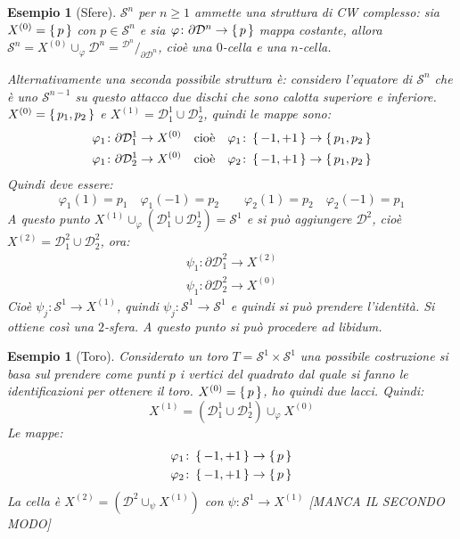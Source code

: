 \documentclass[10pt, twoside=false, x11names]{scrbook}
\newtheorem{example}[theorem]{Esempio}
\newcommand{\Sph}[1][]{\mathcal{S}^#1}
\newcommand{\Disk}[1][]{\mathcal{D}^#1}
\newcommand*\quot[2]{{^{\textstyle #1}\big/_{\textstyle #2}}}
\let\phi\varphi
\begin{document}
\begin{example}[Sfere]
  $ \Sph{n} $ per $ n \geq 1 $ ammette una struttura di CW complesso: sia $ X^{(0)} = \set{p} $ con
  $ p \in \Sph{n} $ e sia $ \phi \colon \partial \Disk{n} \to \set{p} $ mappa costante, allora
  $ \Sph{n} = X^{(0)} \cup_\phi \Disk{n} = \quot{\Disk{n}}{\partial \Disk{n}} $, cioè una $ 0 $-cella e una
  $ n $-cella.

  Alternativamente una seconda possibile struttura è: considero l'equatore di $ \Sph{n} $ che
  è uno $ \Sph{n-1} $ su questo attacco due dischi che sono calotta superiore e inferiore.
  $ X^{(0)} = \set{p_1, p_2} $ e $ X^{(1)} = \Disk{1}_1 \cup \Disk{1}_2 $, quindi le mappe
  sono:
  \begin{gather*}
    \phi_1 \colon \partial \Disk{1}_1 \to X^{(0)} \quad \text{cioè} \quad \phi_1 \colon \set{-1, +1} \to \set{p_1, p_2} \\
    \phi_1 \colon \partial \Disk{1}_2 \to X^{(0)} \quad \text{cioè} \quad \phi_2 \colon \set{-1, +1} \to \set{p_1, p_2}
  \end{gather*}
  Quindi deve essere:
  \[
    \phi_1(1) = p_1 \quad \phi_1(-1) = p_2 \qquad  \phi_2(1) = p_2 \quad \phi_2(-1) = p_1
  \]
  A questo punto $ X^{(1)} \cup_\phi (\Disk{1}_1 \cup \Disk{1}_2) = \Sph{1} $ e si può aggiungere
  $ \Disk{2} $, cioè $ X^{(2)} = \Disk{2}_1 \cup \Disk{2}_2 $, ora:
  \begin{gather*}
    \psi_1 \colon \partial \Disk{2}_1 \to X^{(2)} \\
    \psi_1 \colon \partial \Disk{2}_2 \to X^{(0)}
  \end{gather*}
  Cioè $ \psi_j \colon \Sph{1} \to X^{(1)} $, quindi $ \psi_j \colon \Sph{1} \to \Sph{1} $ e quindi si può prendere
  l'identità. Si ottiene così una $ 2 $-sfera. A questo punto si può procedere ad libidum.
\end{example}

\begin{example}[Toro]
  Considerato un toro $ T = \Sph{1} \times \Sph{1} $ una possibile costruzione si basa sul prendere
  come punti $ p $ i vertici del quadrato dal quale si fanno le identificazioni per ottenere il
  toro. $ X^{(0)} = \set{p} $, ho quindi due lacci. Quindi:
  \[
    X^{(1)} = (\Disk{1}_1 \cup \Disk{1}_2) \cup_\phi X^{(0)}
  \]
  Le mappe:
  \begin{gather*}
    \phi_1 \colon \set{-1, +1} \to \set{p} \\
    \phi_2 \colon \set{-1, +1} \to \set{p}
  \end{gather*}
  La cella è $ X^{(2)} = (\Disk{2} \cup_\psi X^{(1)}) $ con $ \psi \colon \Sph{1} \to X^{(1)} $
  [MANCA IL SECONDO MODO]
\end{example}
\end{document}
